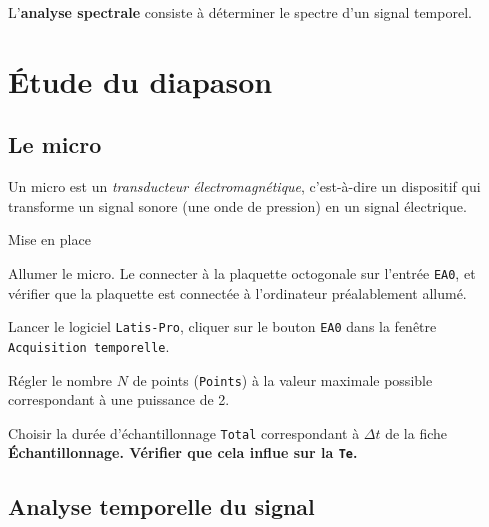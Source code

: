 \documentclass[a4paper,french,bookmarks]{article}
\begin{document}


L'\textbf{analyse spectrale} consiste à déterminer le spectre d'un signal temporel.

\section{Étude du diapason}

\subsection{Le micro}

Un micro est un \textit{\color{main1} transducteur électromagnétique}, c'est-à-dire un dispositif qui transforme un signal sonore (une onde de pression) en un signal électrique.

\begin{experience}{Mise en place}{}
    \begin{enumerate}
        \ithand Allumer le micro. Le connecter à la plaquette octogonale sur l'entrée \texttt{EA0}, et vérifier que la plaquette est connectée à l'ordinateur préalablement allumé.
        
        \ithand Lancer le logiciel \texttt{Latis-Pro}, cliquer sur le bouton \texttt{EA0} dans la fenêtre \texttt{Acquisition temporelle}.

        \ithand Régler le nombre $N$ de points (\texttt{Points}) à la valeur maximale possible correspondant à une puissance de 2.
        
        \ithand Choisir la durée d'échantillonnage \texttt{Total} correspondant à $\Delta t$ de la fiche \bf{\sffamily Échantillonnage}. Vérifier que cela influe sur la  \texttt{Te}.
    \end{enumerate}
\end{experience}


\subsection{Analyse temporelle du signal}\label{subsec:1.2}
\end{document}
